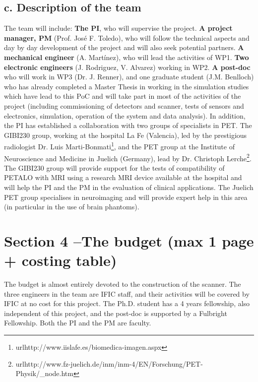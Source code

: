 \documentclass[11pt,a4paper]{article}
\begin{document}
\subsection*{c. Description of the team}
The team will include: {\bf The PI}, who will supervise the project. {\bf A project manager, PM} (Prof. José F. Toledo), who will follow the technical aspects and day by day development of the project and will also seek potential partners. {\bf A mechanical engineer} (A. Martínez), who will lead the activities of WP1. {\bf Two electronic engineers} (J. Rodriguez, V. Alvarez) working in WP2. {\bf A post-doc} who will work in WP3 (Dr. J. Renner), and one graduate student (J.M. Benlloch) who has already completed a Master Thesis in working in the simulation studies which have lead to this PoC and will take part in most of the activities of the project (including commissioning of detectors and scanner, tests of sensors and electronics, simulation, operation of the system and data analysis). In addition, the PI has established a collaboration with two groups of specialists in PET. The GIBI230 group, working at the hospital La Fe (Valencia), led by the prestigious radiologist Dr. Luis Marti-Bonmati\footnote{url{http://www.iislafe.es/biomedica-imagen.aspx}}, and the PET group at the
Institute of Neuroscience and Medicine in Juelich (Germany), lead by Dr.  Christoph Lerche\footnote{url{http://www.fz-juelich.de/inm/inm-4/EN/Forschung/PET-Physik/\_node.htm}}. The GIBI230 group will provide support for the tests of compatibility of PETALO with MRI using a research MRI device available at the hospital and will help the PI and the PM in the evaluation of clinical applications. The Juelich PET group specialises in neuroimaging and will provide expert help in this area (in particular in the use of brain phantoms).

\newpage

\section*{\bf \textsf{Section 4 --The budget (max 1 page + costing table)}}

The budget is almost entirely devoted to the construction of the scanner. The three engineers in the team are IFIC staff, and their activities will be covered by IFIC at no cost for this project. The Ph.D. student has a 4 years fellowship, also independent of this project, and the post-doc is supported by a Fulbright Fellowship. Both the PI and the PM are faculty. 
\end{document}
